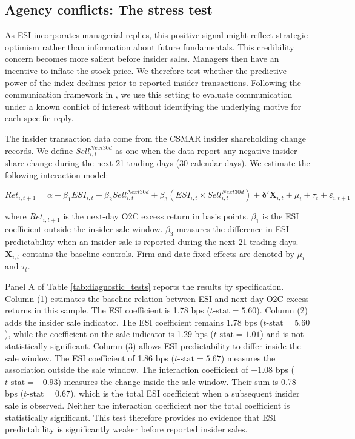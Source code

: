 \documentclass[12pt]{article}
\begin{document}
\subsection{Agency conflicts: The stress test}

As ESI incorporates managerial replies, this positive signal might reflect strategic optimism rather than information about future fundamentals. This credibility concern becomes more salient before insider sales. Managers then have an incentive to inflate the stock price. We therefore test whether the predictive power of the index declines prior to reported insider transactions. Following the communication framework in \citet{crawford1982}, we use this setting to evaluate communication under a known conflict of interest without identifying the underlying motive for each specific reply.

The insider transaction data come from the CSMAR insider shareholding change records. We define $Sell^{Next30d}_{i,t}$ as one when the data report any negative insider share change during the next 21 trading days (30 calendar days). We estimate the following interaction model:

\begin{equation}
    Ret_{i, t+1} = \alpha + \beta_1 ESI_{i,t} + \beta_2 Sell^{Next30d}_{i,t} + \beta_3 (ESI_{i,t} \times Sell^{Next30d}_{i,t}) + \boldsymbol{\delta}'\mathbf{X}_{i,t} + \mu_i + \tau_t + \varepsilon_{i, t+1}
\end{equation}

\noindent where $Ret_{i,t+1}$ is the next-day O2C excess return in basis points. $\beta_1$ is the ESI coefficient outside the insider sale window. $\beta_3$ measures the difference in ESI predictability when an insider sale is reported during the next 21 trading days. $\mathbf{X}_{i,t}$ contains the baseline controls. Firm and date fixed effects are denoted by $\mu_i$ and $\tau_t$.

Panel A of Table \ref{tab:diagnostic_tests} reports the results by specification. Column (1) estimates the baseline relation between ESI and next-day O2C excess returns in this sample. The ESI coefficient is 1.78 bps ($t\text{-stat}=5.60$). Column (2) adds the insider sale indicator. The ESI coefficient remains 1.78 bps ($t\text{-stat}=5.60$), while the coefficient on the sale indicator is 1.29 bps ($t\text{-stat}=1.01$) and is not statistically significant. Column (3) allows ESI predictability to differ inside the sale window. The ESI coefficient of 1.86 bps ($t\text{-stat}=5.67$) measures the association outside the sale window. The interaction coefficient of $-1.08$ bps ($t\text{-stat}=-0.93$) measures the change inside the sale window. Their sum is 0.78 bps ($t\text{-stat}=0.67$), which is the total ESI coefficient when a subsequent insider sale is observed. Neither the interaction coefficient nor the total coefficient is statistically significant. This test therefore provides no evidence that ESI predictability is significantly weaker before reported insider sales.
\end{document}
